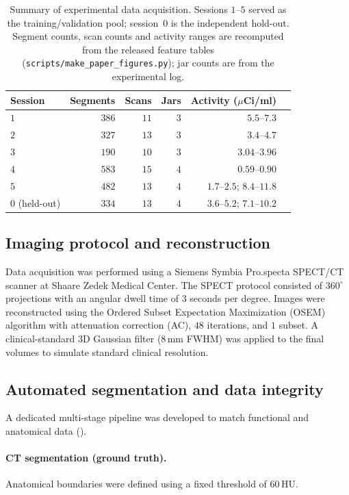 \begin{table}[ht]
\centering
\caption{Summary of experimental data acquisition.
Sessions $1$--$5$ served as the training/validation pool; session~$0$ is the independent hold-out.
Segment counts, scan counts and activity ranges are recomputed from the released feature tables (\texttt{scripts/make\_paper\_figures.py}); jar counts are from the experimental log.}
\label{tab:sessions}
\small
\begin{tabular}{lrrrrl}
\toprule
Session & Segments & Scans & Jars & Activity ($\mu$Ci/ml) \\
\midrule
$1$ & $386$ & $11$ & $3$ & $5.5$--$7.3$ \\
$2$ & $327$ & $13$ & $3$ & $3.4$--$4.7$ \\
$3$ & $190$ & $10$ & $3$ & $3.04$--$3.96$ \\
$4$ & $583$ & $15$ & $4$ & $0.59$--$0.90$ \\
$5$ & $482$ & $13$ & $4$ & $1.7$--$2.5$; $8.4$--$11.8$ \\
$0$ (held-out) & $334$ & $13$ & $4$ & $3.6$--$5.2$; $7.1$--$10.2$ \\
\bottomrule
\end{tabular}
\end{table}

\subsection{Imaging protocol and reconstruction}

Data acquisition was performed using a Siemens Symbia Pro.specta SPECT/CT scanner at Shaare Zedek Medical Center.
The SPECT protocol consisted of $360^\circ$ projections with an angular dwell time of $3$ seconds per degree.
Images were reconstructed using the Ordered Subset Expectation Maximization (OSEM) algorithm with attenuation correction (AC), $48$ iterations, and $1$ subset.
A clinical-standard $3$D Gaussian filter ($8\,\mathrm{mm}$ FWHM) was applied to the final volumes to simulate standard clinical resolution.

\subsection{Automated segmentation and data integrity}

A dedicated multi-stage pipeline was developed to match functional and anatomical data ().

\paragraph{CT segmentation (ground truth).}
Anatomical boundaries were defined using a fixed threshold of $60\,\mathrm{HU}$.

